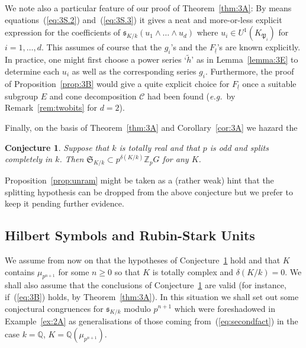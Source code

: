 \documentclass[12pt]{article}
\newtheorem{conj}{Conjecture}[section]
\newcounter{rem}[section]%
\newcommand{\bbQ}{\ensuremath{\mathbb{Q}}}
\newcommand{\bbZ}{\ensuremath{\mathbb{Z}}}
\newcommand{\cC}{\ensuremath{\mathcal{C}}}
\newcommand{\eg}{\emph{e.g.}}
\newcommand{\fP}{\ensuremath{\mathfrak{P}}}
\newcommand{\fs}{\ensuremath{\mathfrak{s}}}
\newcommand{\fS}{\ensuremath{\mathfrak{S}}}
\newcommand{\refeq}[1]{~(\ref{eq:#1})}
\newcommand{\rem}{\refstepcounter{rem}\noindent{\sc Remark \therem}}%
\renewcommand{\therem}{\thesection.\arabic{rem}}
\newcommand{\pnpo}{\ensuremath{{p^{n+1}}}}
\newcommand{\ul}{\ensuremath{{\underline{l}}}}
\begin{document}
We note also a particular feature of our proof of Theorem~\ref{thm:3A}: By means
equations\refeq{3S.2} and\refeq{3S.3} it gives a neat and more-or-less
explicit expression for the coefficients
of $\fs_{K/k}(u_1\wedge\ldots\wedge u_d)$ where $u_i\in U^1(K_{\fP_i})$ for
$i=1,\ldots,d$. This assumes of course that the $g_i$'s and the $F_\ul$'s are known explicitly.
In practice, one might first choose a power series `$\tilde{h}$' as in
Lemma~\ref{lemma:3E} to determine each $u_i$ as well as the corresponding series
$g_i$. Furthermore, the proof of Proposition~\ref{prop:3B} would give a quite explicit
choice for $F_\ul$ once a suitable subgroup $E$ and cone decomposition $\cC$ had been found
(\eg\ by Remark~\ref{rem:twobits} for $d=2$).

Finally, on the basis of Theorem~\ref{thm:3A} and Corollary~\ref{cor:3A}
we hazard the
\begin{conj}\label{conj:4C} Suppose that $k$ is totally real and that $p$ is odd and splits
completely in $k$. Then
$\fS_{K/k}\subset p^{\delta(K/k)}\bbZ_p G$ for any $K$.
\end{conj}
Proposition~\ref{prop:unram} might be
taken as a (rather weak) hint that the splitting hypothesis can be dropped from
the above conjecture but
we prefer to keep it pending further evidence.
\subsection{Hilbert Symbols and Rubin-Stark Units}\label{subsec:rubinstark}
We assume from now on that the hypotheses of
Conjecture~\ref{conj:4C} hold and
that $K$ contains $\mu_{\pnpo}$ for some $n\geq 0$ so that
$K$ is totally complex and $\delta(K/k)=0$.
We shall also assume that the conclusions of
Conjecture~\ref{conj:4C} are valid (for instance, if\refeq{3B} holds, by Theorem~\ref{thm:3A}).
In this situation we shall set out some conjectural
congruences for $\fs_{K/k}$ modulo $\pnpo$ which
were foreshadowed in Example~\ref{ex:2A}
as generalisations of those coming from\refeq{secondfact} in the case $k=\bbQ$,
$K=\bbQ(\mu_\pnpo)$.
\end{document}
